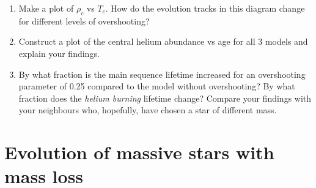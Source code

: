 \documentclass[11pt,a4paper]{article}
\begin{document}
\begin{enumerate}
\item Make a plot of $\rho_c$ vs $T_c$. How do the evolution tracks in this diagram change for different levels of overshooting?

\item Construct a plot of the central helium abundance vs age for all 3 models and explain your findings. 

\item By what fraction is the main sequence lifetime increased for an overshooting parameter of 0.25 compared to the model without overshooting? By what fraction does the \emph{helium burning} lifetime change? Compare your findings with your neighbours who, hopefully, have chosen a star of different mass.

\end{enumerate}

\section{Evolution of massive stars with mass loss}
\end{document}
